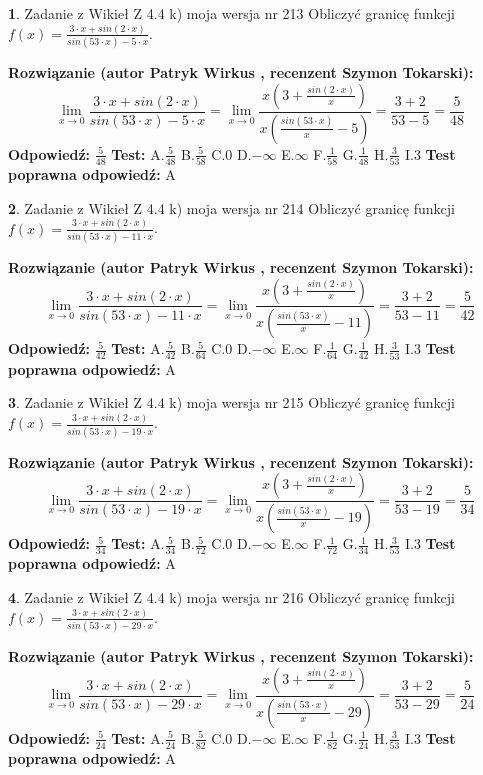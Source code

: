 \documentclass[12pt, a4paper]{article}
\theoremstyle{definition} %
\newtheorem{zad}{}
\newcommand{\zadStart}[1]{\begin{zad}#1\newline}
\newcommand{\zadStop}{\end{zad}}
\newcommand{\rozwStart}[2]{\noindent \textbf{Rozwiązanie (autor #1 , recenzent #2): }\newline}
\newcommand{\rozwStop}{\newline}
\newcommand{\odpStart}{\noindent \textbf{Odpowiedź:}\newline}
\newcommand{\odpStop}{\newline}
\newcommand{\testStart}{\noindent \textbf{Test:}\newline}
\newcommand{\testStop}{\newline}
\newcommand{\kluczStart}{\noindent \textbf{Test poprawna odpowiedź:}\newline}
\newcommand{\kluczStop}{\newline}
\begin{document}
\zadStart{Zadanie z Wikieł Z 4.4 k) moja wersja nr 213}
Obliczyć granicę funkcji $f(x)=\frac{3\cdot x +sin(2\cdot x)}{sin(53\cdot x) -5\cdot x}$.
\zadStop
\rozwStart{Patryk Wirkus}{Szymon Tokarski}
$$\lim\limits_{x\to 0}\frac{3\cdot x +sin(2\cdot x)}{sin(53\cdot x) -5\cdot x}
=\lim\limits_{x\to 0}\frac{x(3+\frac{sin(2\cdot x)}{x})}{x(\frac{sin(53\cdot x)}{x}-5)}
=\frac{3+2}{53-5} = \frac{5}{48}$$
\rozwStop
\odpStart
$\frac{5}{48}$
\odpStop
\testStart
A.$\frac{5}{48}$
B.$\frac{5}{58}$
C.$0$
D.$-\infty$
E.$\infty$
F.$\frac{1}{58}$
G.$\frac{1}{48}$
H.$\frac{3}{53}$
I.$3$
\testStop
\kluczStart
A
\kluczStop



\zadStart{Zadanie z Wikieł Z 4.4 k) moja wersja nr 214}
Obliczyć granicę funkcji $f(x)=\frac{3\cdot x +sin(2\cdot x)}{sin(53\cdot x) -11\cdot x}$.
\zadStop
\rozwStart{Patryk Wirkus}{Szymon Tokarski}
$$\lim\limits_{x\to 0}\frac{3\cdot x +sin(2\cdot x)}{sin(53\cdot x) -11\cdot x}
=\lim\limits_{x\to 0}\frac{x(3+\frac{sin(2\cdot x)}{x})}{x(\frac{sin(53\cdot x)}{x}-11)}
=\frac{3+2}{53-11} = \frac{5}{42}$$
\rozwStop
\odpStart
$\frac{5}{42}$
\odpStop
\testStart
A.$\frac{5}{42}$
B.$\frac{5}{64}$
C.$0$
D.$-\infty$
E.$\infty$
F.$\frac{1}{64}$
G.$\frac{1}{42}$
H.$\frac{3}{53}$
I.$3$
\testStop
\kluczStart
A
\kluczStop



\zadStart{Zadanie z Wikieł Z 4.4 k) moja wersja nr 215}
Obliczyć granicę funkcji $f(x)=\frac{3\cdot x +sin(2\cdot x)}{sin(53\cdot x) -19\cdot x}$.
\zadStop
\rozwStart{Patryk Wirkus}{Szymon Tokarski}
$$\lim\limits_{x\to 0}\frac{3\cdot x +sin(2\cdot x)}{sin(53\cdot x) -19\cdot x}
=\lim\limits_{x\to 0}\frac{x(3+\frac{sin(2\cdot x)}{x})}{x(\frac{sin(53\cdot x)}{x}-19)}
=\frac{3+2}{53-19} = \frac{5}{34}$$
\rozwStop
\odpStart
$\frac{5}{34}$
\odpStop
\testStart
A.$\frac{5}{34}$
B.$\frac{5}{72}$
C.$0$
D.$-\infty$
E.$\infty$
F.$\frac{1}{72}$
G.$\frac{1}{34}$
H.$\frac{3}{53}$
I.$3$
\testStop
\kluczStart
A
\kluczStop



\zadStart{Zadanie z Wikieł Z 4.4 k) moja wersja nr 216}
Obliczyć granicę funkcji $f(x)=\frac{3\cdot x +sin(2\cdot x)}{sin(53\cdot x) -29\cdot x}$.
\zadStop
\rozwStart{Patryk Wirkus}{Szymon Tokarski}
$$\lim\limits_{x\to 0}\frac{3\cdot x +sin(2\cdot x)}{sin(53\cdot x) -29\cdot x}
=\lim\limits_{x\to 0}\frac{x(3+\frac{sin(2\cdot x)}{x})}{x(\frac{sin(53\cdot x)}{x}-29)}
=\frac{3+2}{53-29} = \frac{5}{24}$$
\rozwStop
\odpStart
$\frac{5}{24}$
\odpStop
\testStart
A.$\frac{5}{24}$
B.$\frac{5}{82}$
C.$0$
D.$-\infty$
E.$\infty$
F.$\frac{1}{82}$
G.$\frac{1}{24}$
H.$\frac{3}{53}$
I.$3$
\testStop
\kluczStart
A
\kluczStop
\end{document}
